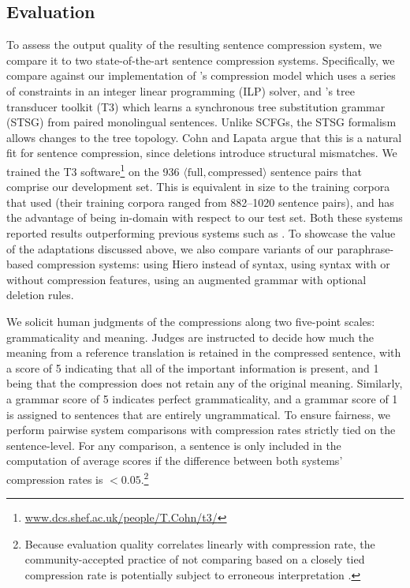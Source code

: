 \documentclass[11pt]{article}
\begin{document}

\vspace{-.2cm}
\subsection{Evaluation} \label{evaluation}

To assess the output quality of the resulting sentence compression
system, we compare it to two state-of-the-art sentence compression
systems.  Specifically, we compare against our implementation of
's compression model which uses a series of
constraints in an integer linear programming (ILP) solver, and
's tree transducer toolkit (T3) which learns a
synchronous tree substitution grammar (STSG) from paired monolingual
sentences.  Unlike SCFGs, the STSG formalism allows changes to the
tree topology. Cohn and Lapata argue that this is a natural fit for
sentence compression, since deletions introduce structural mismatches.
We trained the T3
software\footnote{\url{www.dcs.shef.ac.uk/people/T.Cohn/t3/}} on the
936 $\langle\text{full}, \text{compressed}\rangle$ sentence pairs that
comprise our development set.  This is equivalent in size to the
training corpora that  used (their training corpora
ranged from 882--1020 sentence pairs), and has the advantage of being
in-domain with respect to our test set.  Both these systems reported
results outperforming previous systems such as
. To showcase the value of the adaptations
discussed above, we also compare variants of our paraphrase-based
compression systems: using Hiero instead of syntax, using syntax with or without compression features, using an augmented grammar with optional deletion rules.



We solicit human judgments of the compressions along two five-point
scales: grammaticality and meaning. Judges are instructed to
  decide how much the meaning from a reference translation is retained
  in the compressed sentence, with a score of 5 indicating that all of
  the important information is present, and 1 being that the
  compression does not retain any of the original meaning. Similarly,
  a grammar score of 5 indicates perfect grammaticality, and a grammar
  score of 1 is assigned to sentences that are entirely
  ungrammatical. To ensure fairness, we perform pairwise system
comparisons with compression rates strictly tied on the
sentence-level. For any comparison, a sentence is only included in the
computation of average scores if the difference between both systems'
compression rates is $<0.05$.\footnote{Because evaluation
  quality correlates linearly with compression rate, the
  community-accepted practice of not comparing based on a closely tied
  compression rate is potentially subject to erroneous interpretation
  \cite{Napoles2011}.}
\end{document}
